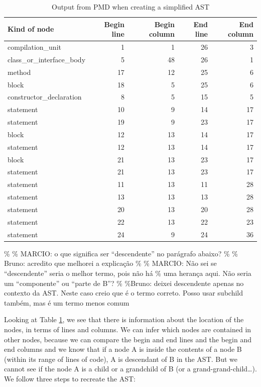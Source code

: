 \documentclass[
]{article}
\begin{document}
\begin{table}[!h]

\caption{\label{tab:unnamed-chunk-2}Output from PMD when creating a simplified AST\label{tab_nodes}}
\centering
\begin{tabular}[t]{l|r|r|r|r}
\hline
Kind of node & Begin line & Begin column & End line & End column\\
\hline
\rowcolor{gray!6}  compilation\_unit & 1 & 1 & 26 & 3\\
\hline
class\_or\_interface\_body & 5 & 48 & 26 & 1\\
\hline
\rowcolor{gray!6}  method & 17 & 12 & 25 & 6\\
\hline
block & 18 & 5 & 25 & 6\\
\hline
\rowcolor{gray!6}  constructor\_declaration & 8 & 5 & 15 & 5\\
\hline
statement & 10 & 9 & 14 & 17\\
\hline
\rowcolor{gray!6}  statement & 19 & 9 & 23 & 17\\
\hline
block & 12 & 13 & 14 & 17\\
\hline
\rowcolor{gray!6}  statement & 12 & 13 & 14 & 17\\
\hline
block & 21 & 13 & 23 & 17\\
\hline
\rowcolor{gray!6}  statement & 21 & 13 & 23 & 17\\
\hline
statement & 11 & 13 & 11 & 28\\
\hline
\rowcolor{gray!6}  statement & 13 & 13 & 13 & 28\\
\hline
statement & 20 & 13 & 20 & 28\\
\hline
\rowcolor{gray!6}  statement & 22 & 13 & 22 & 23\\
\hline
statement & 24 & 9 & 24 & 36\\
\hline
\end{tabular}
\end{table}

\normalsize

\% \% MARCIO: o que significa ser ``descendente'' no parágrafo abaixo?
\% \% Bruno: acredito que melhorei a explicação \% \% MARCIO: Não sei se
``descendente'' seria o melhor termo, pois não há \% uma herança aqui.
Não seria um ``componente'' ou ``parte de B''? \% \%Bruno: deixei
descendente apenas no contexto da AST. Neste caso creio que é o termo
correto. Posso usar subchild também, mas é um termo menos comum

Looking at Table \ref{tab_nodes}, we see that there is information about
the location of the nodes, in terms of lines and columns. We can infer
which nodes are contained in other nodes, because we can compare the
begin and end lines and the begin and end columns and we know that if a
node A is inside the contents of a node B (within its range of lines of
code), A is descendant of B in the AST. But we cannot see if the node A
is a child or a grandchild of B (or a grand-grand-child\ldots). We
follow three steps to recreate the AST:
\end{document}

